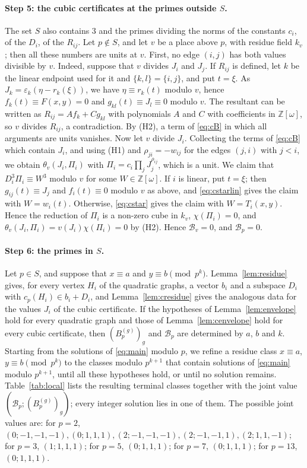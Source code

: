 \documentclass[11pt]{article}
\newcommand{\Z}{\mathbb{Z}}
\begin{document}
\paragraph{Step 5: the cubic certificates at the primes outside $S$.} The set $S$ also contains $3$ and the primes dividing the norms of the constants $c_i$, of the $D_i$, of the $R_{ij}$. Let $p\notin S$, and let $v$ be a place above $p$, with residue field $k_v$; then all these numbers are units at $v$. First, no edge $(i,j)$ has both values divisible by $v$. Indeed, suppose that $v$ divides $J_i$ and $J_j$. If $R_{ij}$ is defined, let $k$ be the linear endpoint used for it and $\{k,l\}=\{i,j\}$, and put $t=\xi$. As $J_k=\varepsilon_k(\eta-r_k(\xi))$, we have $\eta\equiv r_k(t)$ modulo $v$, hence $f_k(t)\equiv F(x,y)=0$ and $g_{kl}(t)\equiv J_l\equiv0$ modulo $v$. The resultant can be written as $R_{ij}=Af_k+Cg_{kl}$ with polynomials $A$ and $C$ with coefficients in $\Z[\omega]$, so $v$ divides $R_{ij}$, a contradiction. By (H2), a term of \eqref{eq:cB} in which all arguments are units vanishes. Now let $v$ divide $J_i$. Collecting the terms of \eqref{eq:cB} which contain $J_i$, and using (H1) and $\rho_{ji}=-w_{ij}$ for the edges $(j,i)$ with $j<i$, we obtain $\theta_v(J_i,\Pi_i)$ with $\Pi_i=c_i\prod_jJ_j^{\rho_{ij}}$, which is a unit. We claim that $D_i^3\Pi_i\equiv W^3$ modulo $v$ for some $W\in\Z[\omega]$. If $i$ is linear, put $t=\xi$; then $g_{ij}(t)\equiv J_j$ and $f_i(t)\equiv0$ modulo $v$ as above, and \eqref{eq:cstarlin} gives the claim with $W=w_i(t)$. Otherwise, \eqref{eq:cstar} gives the claim with $W=T_i(x,y)$. Hence the reduction of $\Pi_i$ is a non-zero cube in $k_v$, $\chi(\Pi_i)=0$, and $\theta_v(J_i,\Pi_i)=v(J_i)\chi(\Pi_i)=0$ by (H2). Hence $\mathcal B_v=0$, and $\mathcal B_p=0$.

\paragraph{Step 6: the primes in $S$.} Let $p\in S$, and suppose that $x\equiv a$ and $y\equiv b\pmod{p^k}$. Lemma~\ref{lem:residue} gives, for every vertex $H_i$ of the quadratic graphs, a vector $b_i$ and a subspace $D_i$ with $c_p(H_i)\in b_i+D_i$, and Lemma~\ref{lem:cresidue} gives the analogous data for the values $J_i$ of the cubic certificate. If the hypotheses of Lemma~\ref{lem:envelope} hold for every quadratic graph and those of Lemma~\ref{lem:cenvelope} hold for every cubic certificate, then $(B^{(g)}_p)_g$ and $\mathcal B_p$ are determined by $a$, $b$ and $k$. Starting from the solutions of \eqref{eq:main} modulo $p$, we refine a residue class $x\equiv a$, $y\equiv b\pmod{p^k}$ to the classes modulo $p^{k+1}$ that contain solutions of \eqref{eq:main} modulo $p^{k+1}$, until all these hypotheses hold, or until no solution remains. Table~\ref{tab:local} lists the resulting terminal classes together with the joint value $(\mathcal B_p;(B^{(g)}_p)_g)$; every integer solution lies in one of them. The possible joint values are: for $p=2$, $(0;-1,-1,-1),\allowbreak (0;1,1,1),\allowbreak (2;-1,-1,-1),\allowbreak (2;-1,-1,1),\allowbreak (2;1,1,-1)$; for $p=3$, $(1;1,1,1)$; for $p=5$, $(0;1,1,1)$; for $p=7$, $(0;1,1,1)$; for $p=13$, $(0;1,1,1)$.
\end{document}
